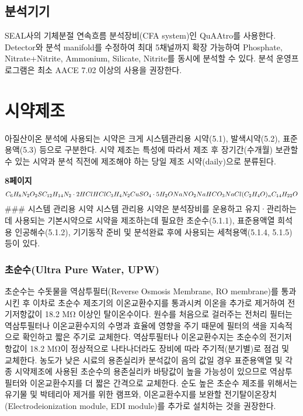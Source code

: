 \documentclass[
]{book}
\begin{document}
\hypertarget{uxbd84uxc11duxae30uxae30}{%
\subsection{분석기기}\label{uxbd84uxc11duxae30uxae30}}

SEAL사의 기체분절 연속흐름 분석장비(CFA system)인 QuAAtro를 사용한다. Detector와 분석 manifold를 수정하여 최대 5채널까지 확장 가능하여 Phosphate, Nitrate+Nitrite, Ammonium, Silicate, Nitrite를 동시에 분석할 수 있다. 분석 운영프로그램은 최소 AACE 7.02 이상의 사용을 권장한다.

\hypertarget{uxc2dcuxc57duxc81cuxc870}{%
\section{시약제조}\label{uxc2dcuxc57duxc81cuxc870}}

아질산이온 분석에 사용되는 시약은 크게 시스템관리용 시약(5.1), 발색시약(5.2), 표준용액(5.3) 등으로 구분한다. 시약 제조는 특성에 따라서 제조 후 장기간(수개월) 보관할 수 있는 시약과 분석 직전에 제조해야 하는 당일 제조 시약(daily)으로 분류된다.

\textbf{8페이지}\\
\[
C_6H_8N_2O_2S\\
C_{12}H_{14}N_2 \cdot 2HCl\\
HCl\\
C_3H_4N_2\\
CuSO_4 \cdot 5H_2O \\
NaNO_2 \\
NaHCO_3 \\
NaCl\\
(C_2H_4O)_n C_{14}H_{22}O
\]
\#\#\# 시스템 관리용 시약
시스템 관리용 시약은 분석장비를 운용하고 유지·관리하는데 사용되는 기본시약으로 시약을 제조하는데 필요한 초순수(5.1.1), 표준용액열 희석용 인공해수(5.1.2), 기기동작 준비 및 분석완료 후에 사용되는 세척용액(5.1.4, 5.1.5) 등이 있다.

\hypertarget{uxcd08uxc21cuxc218ultra-pure-water-upw}{%
\subsubsection{초순수(Ultra Pure Water, UPW)}\label{uxcd08uxc21cuxc218ultra-pure-water-upw}}

초순수는 수돗물을 역삼투필터(Reverse Osmosis Membrane, RO membrane)를 통과시킨 후 이차로 초순수 제조기의 이온교환수지를 통과시켜 이온을 추가로 제거하여 전기저항값이 18.2 MΩ 이상인 탈이온수이다. 원수를 처음으로 걸러주는 전처리 필터는 역삼투필터나 이온교환수지의 수명과 효율에 영향을 주기 때문에 필터의 색을 지속적으로 확인하고 짧은 주기로 교체한다. 역삼투필터나 이온교환수지는 초순수의 전기저항값이 18.2 MΩ이 정상적으로 나타나더라도 장비에 따라 주기적(분기별)로 점검 및 교체한다. 농도가 낮은 시료의 용존실리카 분석값이 음의 값일 경우 표준용액열 및 각종 시약제조에 사용된 초순수의 용존실리카 바탕값이 높을 가능성이 있으므로 역삼투필터와 이온교환수지를 더 짧은 간격으로 교체한다. 순도 높은 초순수 제조를 위해서는 유기물 및 박테리아 제거를 위한 램프와, 이온교환수지를 보완할 전기탈이온장치(Electrodeionization module, EDI module)를 추가로 설치하는 것을 권장한다.
\end{document}
